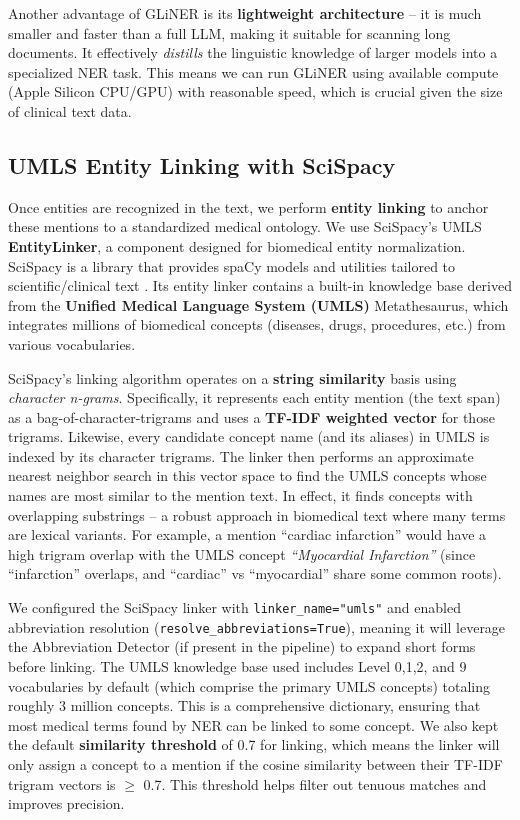 Another advantage of GLiNER is its \textbf{lightweight architecture} – it is much smaller and faster than a full LLM, making it suitable for scanning long documents. It effectively \textit{distills} the linguistic knowledge of larger models into a specialized NER task. This means we can run GLiNER using available compute (Apple Silicon CPU/GPU) with reasonable speed, which is crucial given the size of clinical text data.

\subsection{UMLS Entity Linking with SciSpacy}
\label{sec:entitylinking}

Once entities are recognized in the text, we perform \textbf{entity linking} to anchor these mentions to a standardized medical ontology. We use SciSpacy's UMLS \textbf{EntityLinker}, a component designed for biomedical entity normalization. SciSpacy is a library that provides spaCy models and utilities tailored to scientific/clinical text \parencite{Neumann2019}. Its entity linker contains a built-in knowledge base derived from the \textbf{Unified Medical Language System (UMLS)} Metathesaurus, which integrates millions of biomedical concepts (diseases, drugs, procedures, etc.) from various vocabularies.

SciSpacy's linking algorithm operates on a \textbf{string similarity} basis using \textit{character n-grams}. Specifically, it represents each entity mention (the text span) as a bag-of-character-trigrams and uses a \textbf{TF-IDF weighted vector} for those trigrams. Likewise, every candidate concept name (and its aliases) in UMLS is indexed by its character trigrams. The linker then performs an approximate nearest neighbor search in this vector space to find the UMLS concepts whose names are most similar to the mention text. In effect, it finds concepts with overlapping substrings – a robust approach in biomedical text where many terms are lexical variants. For example, a mention ``cardiac infarction'' would have a high trigram overlap with the UMLS concept \textit{``Myocardial Infarction''} (since ``infarction'' overlaps, and ``cardiac'' vs ``myocardial'' share some common roots).

We configured the SciSpacy linker with \texttt{linker\_name="umls"} and enabled abbreviation resolution (\texttt{resolve\_abbreviations=True}), meaning it will leverage the Abbreviation Detector (if present in the pipeline) to expand short forms before linking. The UMLS knowledge base used includes Level 0,1,2, and 9 vocabularies by default (which comprise the primary UMLS concepts) totaling roughly 3 million concepts. This is a comprehensive dictionary, ensuring that most medical terms found by NER can be linked to some concept. We also kept the default \textbf{similarity threshold} of 0.7 for linking, which means the linker will only assign a concept to a mention if the cosine similarity between their TF-IDF trigram vectors is $\geq$ 0.7. This threshold helps filter out tenuous matches and improves precision.

